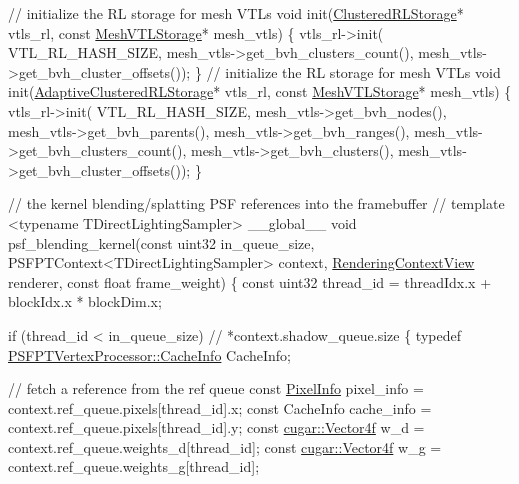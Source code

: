 \begin{DoxyCodeInclude}
    \textcolor{comment}{// initialize the RL storage for mesh VTLs}
    \textcolor{keywordtype}{void} init(\hyperlink{struct_clustered_r_l_storage}{ClusteredRLStorage}* vtls\_rl, \textcolor{keyword}{const} 
      \hyperlink{struct_mesh_v_t_l_storage}{MeshVTLStorage}* mesh\_vtls)
    \{
        vtls\_rl->init(
            VTL\_RL\_HASH\_SIZE,
            mesh\_vtls->get\_bvh\_clusters\_count(),
            mesh\_vtls->get\_bvh\_cluster\_offsets());
    \}
    \textcolor{comment}{// initialize the RL storage for mesh VTLs}
    \textcolor{keywordtype}{void} init(\hyperlink{struct_adaptive_clustered_r_l_storage}{AdaptiveClusteredRLStorage}* vtls\_rl, \textcolor{keyword}{const} 
      \hyperlink{struct_mesh_v_t_l_storage}{MeshVTLStorage}* mesh\_vtls)
    \{
        vtls\_rl->init(
            VTL\_RL\_HASH\_SIZE,
            mesh\_vtls->get\_bvh\_nodes(),
            mesh\_vtls->get\_bvh\_parents(),
            mesh\_vtls->get\_bvh\_ranges(),
            mesh\_vtls->get\_bvh\_clusters\_count(),
            mesh\_vtls->get\_bvh\_clusters(),
            mesh\_vtls->get\_bvh\_cluster\_offsets());
    \}
    
    \textcolor{comment}{// the kernel blending/splatting PSF references into the framebuffer}
    \textcolor{comment}{//}
    \textcolor{keyword}{template} <\textcolor{keyword}{typename} TDirectLightingSampler>
    \_\_global\_\_
    \textcolor{keywordtype}{void} psf\_blending\_kernel(\textcolor{keyword}{const} uint32 in\_queue\_size, PSFPTContext<TDirectLightingSampler> context, 
      \hyperlink{struct_rendering_context_view}{RenderingContextView} renderer, \textcolor{keyword}{const} \textcolor{keywordtype}{float} frame\_weight)
    \{
        \textcolor{keyword}{const} uint32 thread\_id = threadIdx.x + blockIdx.x * blockDim.x;

        \textcolor{keywordflow}{if} (thread\_id < in\_queue\_size) \textcolor{comment}{// *context.shadow\_queue.size}
        \{
            \textcolor{keyword}{typedef} \hyperlink{union_p_s_f_p_t_vertex_processor_1_1_cache_info}{PSFPTVertexProcessor::CacheInfo} CacheInfo;

            \textcolor{comment}{// fetch a reference from the ref queue}
            \textcolor{keyword}{const} \hyperlink{union_pixel_info}{PixelInfo}          pixel\_info = context.ref\_queue.pixels[thread\_id].x;
            \textcolor{keyword}{const} CacheInfo       cache\_info = context.ref\_queue.pixels[thread\_id].y;
            \textcolor{keyword}{const} \hyperlink{structcugar_1_1_vector}{cugar::Vector4f} w\_d = context.ref\_queue.weights\_d[thread\_id];
            \textcolor{keyword}{const} \hyperlink{structcugar_1_1_vector}{cugar::Vector4f} w\_g = context.ref\_queue.weights\_g[thread\_id];


\end{DoxyCodeInclude}
